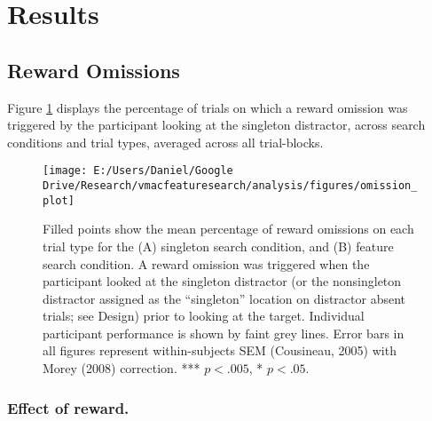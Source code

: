 \documentclass[man, a4paper, noextraspace, 11pt,floatsintext]{apa6}
\begin{document}
\section{Results}\label{results}

\subsection{Reward Omissions}\label{reward-omissions}

Figure \ref{fig:OmissionPlot} displays the percentage of trials on which
a reward omission was triggered by the participant looking at the
singleton distractor, across search conditions and trial types, averaged
across all trial-blocks.

\begin{figure}[!h]

{\centering \texttt{[image: E:/Users/Daniel/Google Drive/Research/vmacfeaturesearch/analysis/figures/omission\_plot]} 

}

\caption{Filled points show the mean percentage of reward
omissions on each trial type for the (A) singleton search condition, and
(B) feature search condition. A reward omission was triggered when the
participant looked at the singleton distractor (or the nonsingleton
distractor assigned as the \enquote{singleton} location on distractor
absent trials; see Design) prior to looking at the target. Individual
participant performance is shown by faint grey lines. Error bars in all
figures represent within-subjects SEM (Cousineau, 2005) with Morey
(2008) correction. *** \(p<.005\), * \(p<.05\).}\label{fig:OmissionPlot}
\end{figure}

\subsubsection{Effect of reward.}\label{effect-of-reward.}
\end{document}
